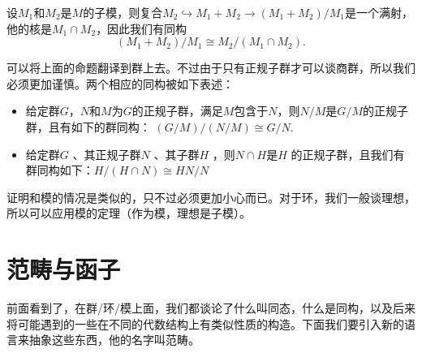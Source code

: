 \para 设$M_1$和$M_2$是$M$的子模，则复合$M_2\hookrightarrow M_1+M_2 \to (M_1+M_2)/M_1$是一个满射，他的核是$M_1\cap M_2$，因此我们有同构
\[
	(M_1+M_2)/M_1\cong M_2/(M_1\cap M_2).
\]

\para 可以将上面的命题翻译到群上去。不过由于只有正规子群才可以谈商群，所以我们必须更加谨慎。两个相应的同构被如下表述：

\begin{itemize}
\item 给定群$G$，$N$和$M$为$G$的正规子群，满足$M$包含于$N$，则$N/M$是$G/M$的正规子群，且有如下的群同构： $ (G/M)/(N/M)\cong G/N$.

\item 给定群$G$ 、其正规子群$N$ 、其子群$H$ ，则$N\cap H$是$H$ 的正规子群，且我们有群同构如下：$H/(H\cap N)\cong HN/N$
\end{itemize}

证明和模的情况是类似的，只不过必须更加小心而已。对于环，我们一般谈理想，所以可以应用模的定理（作为模，理想是子模）。

\section{范畴与函子}

前面看到了，在群/环/模上面，我们都谈论了什么叫同态，什么是同构，以及后来将可能遇到的一些在不同的代数结构上有类似性质的构造。下面我们要引入新的语言来抽象这些东西，他的名字叫范畴。

